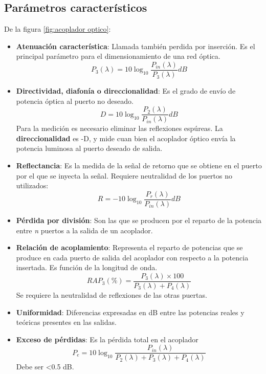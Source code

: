 \documentclass[
	12pt, %
	fleqn, %
	a4paper, %
	oneside, %
]{LegrandOrangeBook}
\begin{document}
\subsection{Parámetros característicos}
De la figura  \ref{fig:acoplador optico}:
\begin{itemize}
\item \textbf{Atenuación característica}: Llamada también perdida por inserción. Es el principal parámetro para el dimensionamiento de una red óptica.
\begin{equation}
P_3(\lambda)=10\log_{10}\frac{P_{in}(\lambda)}{P_3(\lambda)} dB
\end{equation}
\item \textbf{Directividad, diafonía o direccionalidad}: Es el grado de envío de potencia óptica al puerto no deseado.
\begin{equation}
D=10\log_{10}\frac{P_2(\lambda)}{P_{in}(\lambda)} dB
\end{equation}
Para la medición es necesario eliminar las reflexiones espúreas.
La \textbf{direccionalidad} es -D, y mide cuan bien el acoplador óptico envía la potencia luminosa al puerto deseado de salida.
\item \textbf{Reflectancia}: Es la medida de la señal de retorno que se obtiene en el puerto por el que se inyecta la señal. Requiere neutralidad de los puertos no utilizados:
\begin{equation}
R=-10\log_{10}\frac{P_r(\lambda)}{P_{in}(\lambda)} dB
\end{equation}
\item \textbf{Pérdida por división}: Son las que se producen por el reparto de la potencia entre \textit{n} puertos a la salida de un acoplador.
\item \textbf{Relación de acoplamiento}: Representa el reparto de potencias que se produce en cada puerto de salida del acoplador con respecto a la potencia insertada. Es función de la longitud de onda.
\begin{equation}
RA P_3 (\%)=\frac{P_3(\lambda)\times 100}{P_3(\lambda)+P_4(\lambda)}
\end{equation}
Se requiere la neutralidad de reflexiones de las otras puertas.
\item \textbf{Uniformidad}: Diferencias expresadas en dB entre las potencias reales y teóricas presentes en las salidas.
\item \textbf{Exceso de pérdidas}: Es la pérdida total en el acoplador
\begin{equation}
P_e=10\log_{10}\frac{P_{in}(\lambda)}{P_2(\lambda)+P_3(\lambda)+P_4(\lambda)}
\end{equation}
Debe ser <0.5 dB.
\end{itemize}
\end{document}
